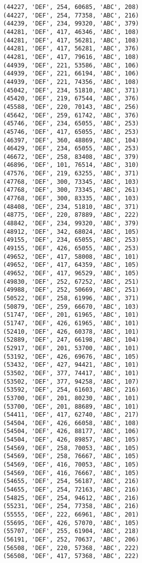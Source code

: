 \begin{verbatim}
(44227, 'DEF', 254, 60685, 'ABC', 208)
(44227, 'DEF', 254, 77358, 'ABC', 216)
(44239, 'DEF', 234, 99320, 'ABC', 379)
(44281, 'DEF', 417, 46346, 'ABC', 108)
(44281, 'DEF', 417, 56281, 'ABC', 108)
(44281, 'DEF', 417, 56281, 'ABC', 376)
(44281, 'DEF', 417, 79616, 'ABC', 108)
(44939, 'DEF', 221, 53586, 'ABC', 106)
(44939, 'DEF', 221, 66194, 'ABC', 106)
(44939, 'DEF', 221, 74356, 'ABC', 108)
(45042, 'DEF', 234, 51810, 'ABC', 371)
(45420, 'DEF', 219, 67544, 'ABC', 376)
(45588, 'DEF', 220, 70143, 'ABC', 256)
(45642, 'DEF', 259, 61742, 'ABC', 376)
(45746, 'DEF', 234, 65055, 'ABC', 253)
(45746, 'DEF', 417, 65055, 'ABC', 253)
(46397, 'DEF', 360, 48869, 'ABC', 104)
(46429, 'DEF', 234, 65055, 'ABC', 253)
(46672, 'DEF', 258, 83408, 'ABC', 379)
(46896, 'DEF', 101, 76514, 'ABC', 310)
(47576, 'DEF', 219, 63255, 'ABC', 371)
(47768, 'DEF', 300, 73345, 'ABC', 103)
(47768, 'DEF', 300, 73345, 'ABC', 261)
(47768, 'DEF', 300, 83335, 'ABC', 103)
(48408, 'DEF', 234, 51810, 'ABC', 371)
(48775, 'DEF', 220, 87889, 'ABC', 222)
(48842, 'DEF', 234, 99320, 'ABC', 379)
(48912, 'DEF', 342, 68024, 'ABC', 105)
(49155, 'DEF', 234, 65055, 'ABC', 253)
(49155, 'DEF', 426, 65055, 'ABC', 253)
(49652, 'DEF', 417, 58008, 'ABC', 101)
(49652, 'DEF', 417, 64359, 'ABC', 105)
(49652, 'DEF', 417, 96529, 'ABC', 105)
(49830, 'DEF', 252, 67252, 'ABC', 251)
(49988, 'DEF', 252, 50669, 'ABC', 251)
(50522, 'DEF', 258, 61996, 'ABC', 371)
(50879, 'DEF', 259, 66670, 'ABC', 103)
(51747, 'DEF', 201, 61965, 'ABC', 101)
(51747, 'DEF', 426, 61965, 'ABC', 101)
(52410, 'DEF', 426, 60378, 'ABC', 101)
(52889, 'DEF', 247, 66198, 'ABC', 104)
(52917, 'DEF', 201, 53700, 'ABC', 101)
(53192, 'DEF', 426, 69676, 'ABC', 105)
(53432, 'DEF', 427, 94421, 'ABC', 101)
(53502, 'DEF', 377, 74417, 'ABC', 101)
(53502, 'DEF', 377, 94258, 'ABC', 107)
(53592, 'DEF', 254, 61603, 'ABC', 216)
(53700, 'DEF', 201, 80230, 'ABC', 101)
(53700, 'DEF', 201, 88689, 'ABC', 101)
(54411, 'DEF', 417, 62740, 'ABC', 217)
(54504, 'DEF', 426, 66058, 'ABC', 108)
(54504, 'DEF', 426, 88177, 'ABC', 106)
(54504, 'DEF', 426, 89857, 'ABC', 105)
(54569, 'DEF', 258, 70053, 'ABC', 105)
(54569, 'DEF', 258, 76667, 'ABC', 105)
(54569, 'DEF', 416, 70053, 'ABC', 105)
(54569, 'DEF', 416, 76667, 'ABC', 105)
(54655, 'DEF', 254, 56187, 'ABC', 216)
(54655, 'DEF', 254, 72163, 'ABC', 216)
(54825, 'DEF', 254, 94612, 'ABC', 216)
(55231, 'DEF', 254, 77358, 'ABC', 216)
(55555, 'DEF', 222, 66961, 'ABC', 201)
(55695, 'DEF', 426, 57070, 'ABC', 105)
(55707, 'DEF', 255, 61904, 'ABC', 218)
(56191, 'DEF', 252, 70637, 'ABC', 206)
(56508, 'DEF', 220, 57368, 'ABC', 222)
(56508, 'DEF', 417, 57368, 'ABC', 222)

\end{verbatim}
